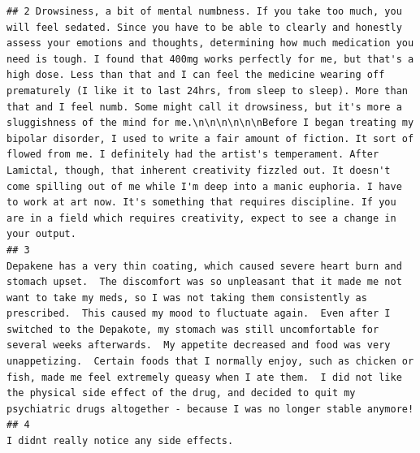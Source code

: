 \documentclass[spanish,]{article}
\begin{document}
\begin{verbatim}
## 2 Drowsiness, a bit of mental numbness. If you take too much, you will feel sedated. Since you have to be able to clearly and honestly assess your emotions and thoughts, determining how much medication you need is tough. I found that 400mg works perfectly for me, but that's a high dose. Less than that and I can feel the medicine wearing off prematurely (I like it to last 24hrs, from sleep to sleep). More than that and I feel numb. Some might call it drowsiness, but it's more a sluggishness of the mind for me.\n\n\n\n\n\nBefore I began treating my bipolar disorder, I used to write a fair amount of fiction. It sort of flowed from me. I definitely had the artist's temperament. After Lamictal, though, that inherent creativity fizzled out. It doesn't come spilling out of me while I'm deep into a manic euphoria. I have to work at art now. It's something that requires discipline. If you are in a field which requires creativity, expect to see a change in your output.
## 3                                                                                                                                                                                                                                                                                                             Depakene has a very thin coating, which caused severe heart burn and stomach upset.  The discomfort was so unpleasant that it made me not want to take my meds, so I was not taking them consistently as prescribed.  This caused my mood to fluctuate again.  Even after I switched to the Depakote, my stomach was still uncomfortable for several weeks afterwards.  My appetite decreased and food was very unappetizing.  Certain foods that I normally enjoy, such as chicken or fish, made me feel extremely queasy when I ate them.  I did not like the physical side effect of the drug, and decided to quit my psychiatric drugs altogether - because I was no longer stable anymore!
## 4                                                                                                                                                                                                                                                                                                                                                                                                                                                                                                                                                                                                                                                                                                                                                                                                                                                                                                                                                                     I didnt really notice any side effects.

\end{verbatim}
\end{document}
